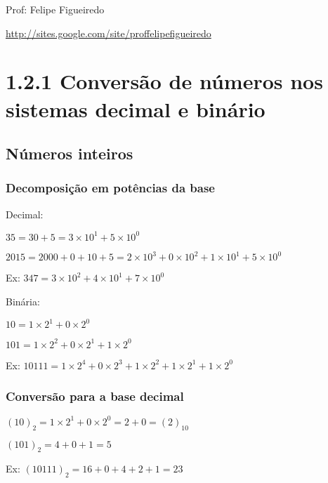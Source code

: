 \documentclass[a4paper]{article}
\begin{document}
\parbox[c]{.825\textwidth}{\raggedright%
{Prof: Felipe Figueiredo\par}
{\url{http://sites.google.com/site/proffelipefigueiredo}}

\vspace{1cm}
}



\section*{1.2.1 Conversão de números nos sistemas decimal e binário}

\subsection*{Números inteiros}
\subsubsection*{Decomposição em potências da base}
 
Decimal:

$35 = 30+5 = 3\times 10^1 + 5\times 10^0$

$2015 = 2000 + 0+ 10 + 5 = 2\times 10^3+0\times 10^2+1\times 10^1+5\times 10^0$

Ex: $347 = 3\times 10^2 + 4\times 10^1+7\times 10^0$

Binária:

$10 = 1\times 2^1+0\times 2^0$

$101=1\times 2^2+0\times 2^1+1\times 2^0$

Ex: $10111 = 1\times 2^4  + 0\times 2^3 + 1\times 2^2 + 1\times 2^1 + 1\times 2^0$

\subsubsection*{Conversão para a base decimal}

$(10)_2 = 1\times 2^1+0\times 2^0 = 2+0 = (2)_{10}$

$(101)_2 = 4+0+1 = 5$

Ex: $(10111)_2 = 16 + 0 + 4 + 2 +1 = 23$
\end{document}
